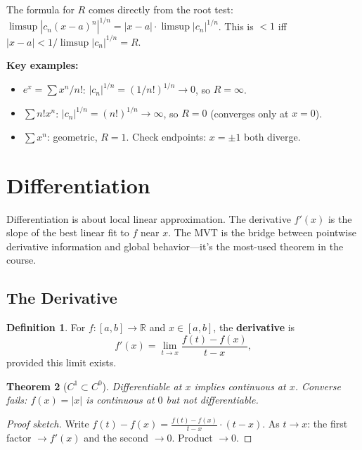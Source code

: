 \documentclass[11pt]{article}
\newcommand{\R}{\mathbb{R}}
\theoremstyle{myplain}
\newtheorem{theorem}{Theorem}[section]
\theoremstyle{definition}
\newtheorem{definition}[theorem]{Definition}
\theoremstyle{remark}
\begin{document}
\begin{insight}
The formula for $R$ comes directly from the root test: $\limsup |c_n(x-a)^n|^{1/n} = |x-a| \cdot \limsup |c_n|^{1/n}$. This is $< 1$ iff $|x-a| < 1/\limsup|c_n|^{1/n} = R$.

\textbf{Key examples:}
\begin{itemize}
  \item $e^x = \sum x^n/n!$: $|c_n|^{1/n} = (1/n!)^{1/n} \to 0$, so $R = \infty$.
  \item $\sum n! x^n$: $|c_n|^{1/n} = (n!)^{1/n} \to \infty$, so $R = 0$ (converges only at $x = 0$).
  \item $\sum x^n$: geometric, $R = 1$. Check endpoints: $x = \pm 1$ both diverge.
\end{itemize}
\end{insight}

\section{Differentiation}

\begin{bigpicture}
Differentiation is about local linear approximation. The derivative $f'(x)$ is the slope of the best linear fit to $f$ near $x$. The MVT is the bridge between pointwise derivative information and global behavior---it's the most-used theorem in the course.
\end{bigpicture}

\subsection{The Derivative}

\begin{definition}
For $f: [a,b] \to \R$ and $x \in [a,b]$, the \textbf{derivative} is
$$f'(x) = \lim_{t \to x} \frac{f(t) - f(x)}{t - x},$$
provided this limit exists.
\end{definition}

\begin{theorem}[$C^1 \subset C^0$]
Differentiable at $x$ implies continuous at $x$. Converse fails: $f(x) = |x|$ is continuous at $0$ but not differentiable.
\end{theorem}

\begin{proof}[Proof sketch]
Write $f(t) - f(x) = \frac{f(t)-f(x)}{t-x} \cdot (t-x)$. As $t \to x$: the first factor $\to f'(x)$ and the second $\to 0$. Product $\to 0$.
\end{proof}
\end{document}
